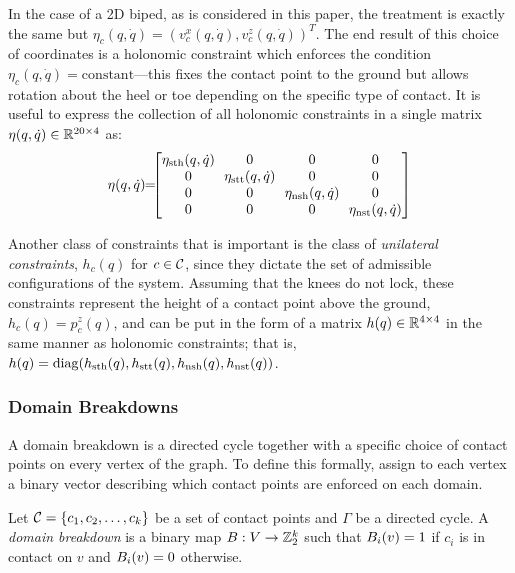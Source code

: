 In the case of a 2D biped, as is considered in this paper, the treatment is exactly the same but $\eta_{c}(q, {\dot q}) = (v_{c}^{x}(q, {\dot q}), v_{c}^{z}(q, {\dot q}))^T$. The end result of this choice of coordinates is a holonomic constraint which enforces the condition $\eta_{c}(q, {\dot q}) = \mathrm{constant}$---this fixes the contact point to the ground but allows rotation about the heel or toe depending on the specific type of contact.  It is useful to express the collection of all holonomic constraints in a single matrix $\eta(q, {\dot q}) \in \mathbb{R}^{20 \times 4}$ as:
\begin{align}
  \eta(q, {\dot q}) \!\! = \!\!\! \left[\!\!\begin{array}{c c c c}
    \! \eta_{\sth}(q, {\dot q}) \! & 0 & 0 & 0 \\
    0 & \! \eta_{\stt}(q, {\dot q}) \! & 0 & 0 \\
    0 & 0 & \! \eta_{\nsh}(q, {\dot q}) \! & 0 \\
    0 & 0 & 0 & \! \eta_{\nst}(q, {\dot q}) \!
    \end{array}\!\!\right]
\end{align}

Another class of constraints that is important is the class of {\it unilateral constraints}, $h_{c}(q)$ for $c \in \mathcal{C}$, since they dictate the set of admissible configurations of the system.  Assuming that the knees do not lock, these constraints represent the height of a contact point above the ground, $h_{c}(q) = p_{c}^{z}(q)$, and can be put in the form of a matrix $h(q) \in \mathbb{R}^{4 \times 4}$ in the same manner as holonomic constraints; that is, $h(q) = \mathrm{diag}(h_{\mathrm{sth}}(q), h_{\mathrm{stt}}(q), h_{\mathrm{nsh}}(q), h_{\mathrm{nst}}(q))$.

\subsubsection{Domain Breakdowns}  A domain breakdown is a directed cycle together with a specific choice of contact points on every vertex of the graph. To define this formally, assign to each vertex a binary vector describing which contact points are enforced on each domain.

\gap

\begin{definition}
  \label{def:domainbreakdown}
  Let $\mathcal{C} = \{c_{1}, c_{2}, \ldots, c_{k}\}$ be a set of contact points and $\Gamma$ be a directed cycle.  A {\it domain breakdown} is a binary map $B : V \to \mathbb{Z}_{2}^{k}$ such that $B_{i}(v) = 1$ if $c_{i}$ is in contact on $v$ and $B_{i}(v) = 0$ otherwise.
\end{definition}

